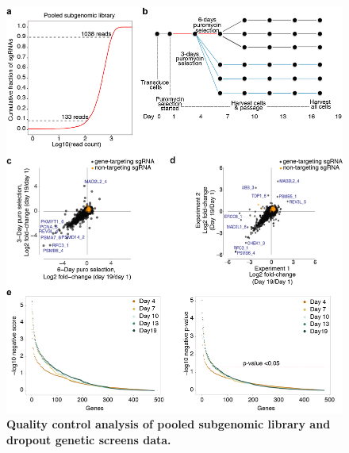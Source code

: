 

\renewcommand{\figurename}{Supplementary Figure}

\begin{figure}
    \centering
    \includegraphics[width=1\textwidth]{supplement/figures/pooled_screen}
    \caption[Quality control of dropout screens]
            {\small{\textbf{Quality control analysis of pooled subgenomic library and dropout genetic screens data.}}
            }
        \label{sfig:dropout-screen}
\end{figure}

